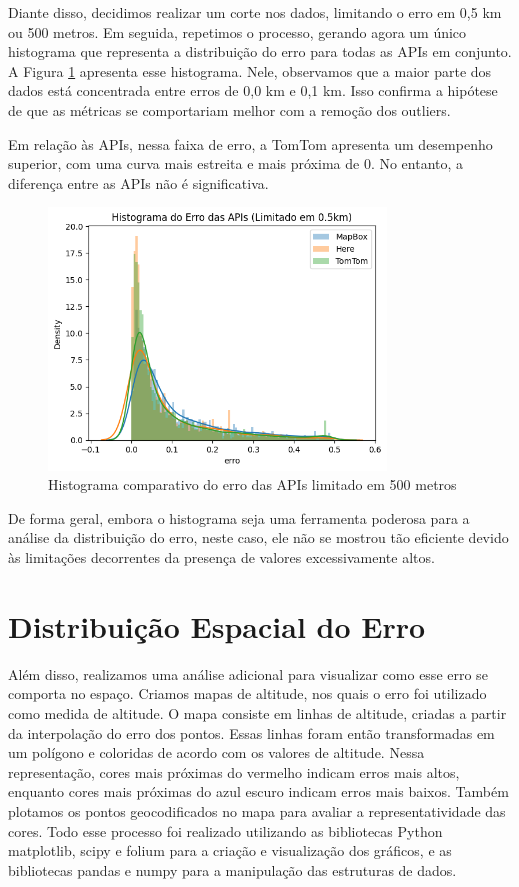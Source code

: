 Diante disso, decidimos realizar um corte nos dados, limitando o erro em 0,5 km ou 500 metros. Em seguida, repetimos o processo, gerando agora um único histograma que representa a distribuição do erro para todas as APIs em conjunto. A Figura \ref{fig:histLimitado} apresenta esse histograma. Nele, observamos que a maior parte dos dados está concentrada entre erros de 0,0 km e 0,1 km. Isso confirma a hipótese de que as métricas se comportariam melhor com a remoção dos outliers.

Em relação às APIs, nessa faixa de erro, a TomTom apresenta um desempenho superior, com uma curva mais estreita e mais próxima de 0. No entanto, a diferença entre as APIs não é significativa.

 
\begin{figure}[h]
  \centering
  \includegraphics[width=0.8\textwidth]{Figuras/hist5.png}
  \caption{Histograma comparativo do erro das APIs limitado em 500 metros}
  \label{fig:histLimitado}
\end{figure}

De forma geral, embora o histograma seja uma ferramenta poderosa para a análise da distribuição do erro, neste caso, ele não se mostrou tão eficiente devido às limitações decorrentes da presença de valores excessivamente altos.


\section{Distribuição Espacial do Erro}

Além disso, realizamos uma análise adicional para visualizar como esse erro se comporta no espaço. Criamos mapas de altitude, nos quais o erro foi utilizado como medida de altitude. O mapa consiste em linhas de altitude, criadas a partir da interpolação do erro dos pontos. Essas linhas foram então transformadas em um polígono e coloridas de acordo com os valores de altitude. Nessa representação, cores mais próximas do vermelho indicam erros mais altos, enquanto cores mais próximas do azul escuro indicam erros mais baixos. Também plotamos os pontos geocodificados no mapa para avaliar a representatividade das cores. Todo esse processo foi realizado utilizando as bibliotecas Python matplotlib, scipy e folium para a criação e visualização dos gráficos, e as bibliotecas pandas e numpy para a manipulação das estruturas de dados.

